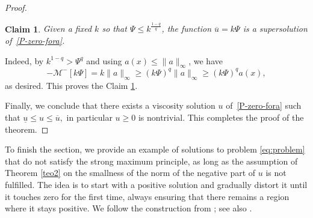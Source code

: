 \documentclass[11pt]{article}
\newtheorem{claim}{Claim}
\begin{document}
\begin{proof}
\begin{claim}\label{Claim2-ex}
Given a fixed \(k \) so that \(\Psi\leq k^{\frac{1-q}{q}}\), the function \(\overline{u}=k\Psi\) is a supersolution of~\eqref{P-zero-fora}.
\end{claim}

Indeed, by \(k^{1-q}>\Psi^{q}\) and using \(a(x)\leq \|a\|_{\infty}\), we have \[-\mathcal{M}^{-}[k\Psi] = k\|a\|_{\infty} \geq (k\Psi)^{q}\|a\|_{\infty} \geq (k\Psi)^{q}a(x),\] as desired. This proves the Claim \ref{Claim2-ex}.

Finally, we conclude that there exists a viscosity solution \(u\) of~\eqref{P-zero-fora} such that \(\underline{u}\leq u \leq \overline{u},\) in particular \(u\geq0\) is nontrivial. 
This completes the proof of the theorem.
\end{proof}


To finish the section, we provide an example of solutions to problem \eqref{eq:problem} that do not satisfy the strong maximum principle, as long as the assumption of Theorem \ref{teo2} on the smallness of the norm of the negative part of \(u\) is not fulfilled. 
The idea is to start with a positive solution and gradually distort it until it touches zero for the first time, always ensuring that there remains a region where it stays positive. We follow the construction from \cite{Kassmann}; see also \cite{bucur2016nonlocal}.
\end{document}
